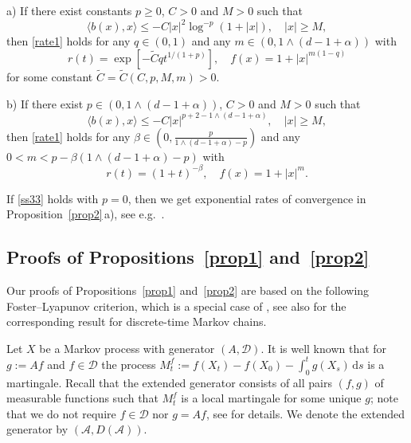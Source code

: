 \documentclass{aptpub}
\newcommand\dup{\mathrm{d}}
\numberwithin{equation}{section}
\begin{document}
\begin{prop}\label{prop2}
\textup{a)}
    If there exist constants $p\geq0$, $C>0$ and $M>0$ such that
    \begin{equation}\label{ss33}
        \langle b(x), x\rangle
        \leq -C|x|^2\log^{-p}(1+|x|),
        \quad |x|\geq M,
    \end{equation}
    then \eqref{rate1} holds for any $q\in(0,1)$ and any $m\in(0,1\wedge(d-1+\alpha))$ with
    $$
        r(t)=\exp\left[-\widetilde{C}qt^{1/(1+p)}\right],
        \quad f(x)=1+|x|^{m(1-q)}
    $$
    for some constant $\widetilde{C}=\widetilde{C}(C,p,M,m)>0$.

\medskip\noindent\textup{b)}
    If there exist $p\in(0,1\wedge(d-1+\alpha))$, $C>0$ and $M>0$ such that
    \begin{equation}\label{ss44}
        \langle b(x), x\rangle\leq -C|x|^{p+2-1\wedge(d-1+\alpha)},
        \quad |x|\geq M,
    \end{equation}
    then \eqref{rate1} holds for any $\beta\in\left(0,\frac{p}{1\wedge(d-1+\alpha)-p}\right)$ and any $0<m<p-\beta(1\wedge(d-1+\alpha)-p)$  with
    $$
        r(t)=(1+t)^{-\beta},
        \quad
        f(x)=1+|x|^m.
    $$
\end{prop}

\begin{rem}
    If \eqref{ss33} holds with $p=0$, then we get exponential rates of convergence in Proposition~\ref{prop2}\,a),
    see e.g.\ \cite[Lemma 2.4]{mas07}.
\end{rem}


\subsection{Proofs of Propositions~\ref{prop1} and~\ref{prop2}}

Our proofs of Propositions~\ref{prop1} and~\ref{prop2} are based on the following Foster--Lyapunov criterion, which is a special case of \cite[Theorem 3.2]{dou09}, see also \cite[Theorem 2.8]{DFMS04} for the corresponding result for discrete-time Markov chains.


Let $X$ be a Markov process with generator $(A,\mathcal D)$. It is well known that for $g:=Af$ and $f\in\mathcal D$ the process $M_t^f := f(X_t) - f(X_0) - \int_0^t g(X_s)\,\dup s$ is a martingale. Recall that the extended generator consists of all pairs $(f,g)$ of measurable functions such that $M_t^f$ is a local martingale for some unique $g$; note that we do not require $f\in\mathcal D$ nor $g=Af$, see \cite[p.\ 25, 26]{BSW14} for details. We denote the extended generator by $(\mathscr{A},D(\mathscr{A}))$.
\end{document}
